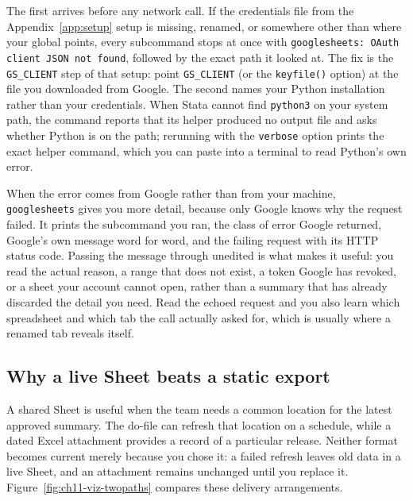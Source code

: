 \documentclass[
    a4paper,
    fontsize=10pt,
    twoside=true,
    numbers=noenddot,
]{kaobook}
\begin{document}
The first arrives before any network call. If the credentials file from the Appendix~\ref{app:setup} setup is missing, renamed, or somewhere other than where your global points, every subcommand stops at once with \texttt{googlesheets: OAuth client JSON not found}, followed by the exact path it looked at. The fix is the \texttt{GS\_CLIENT} step of that setup: point \texttt{GS\_CLIENT} (or the \texttt{keyfile()} option) at the file you downloaded from Google. The second names your Python installation rather than your credentials. When Stata cannot find \texttt{python3} on your system path, the command reports that its helper produced no output file and asks whether Python is on the path; rerunning with the \texttt{verbose} option prints the exact helper command, which you can paste into a terminal to read Python's own error.

When the error comes from Google rather than from your machine, \texttt{googlesheets} gives you more detail, because only Google knows why the request failed. It prints the subcommand you ran, the class of error Google returned, Google's own message word for word, and the failing request with its HTTP status code. Passing the message through unedited is what makes it useful: you read the actual reason, a range that does not exist, a token Google has revoked, or a sheet your account cannot open, rather than a summary that has already discarded the detail you need. Read the echoed request and you also learn which spreadsheet and which tab the call actually asked for, which is usually where a renamed tab reveals itself.

\subsection{Why a live Sheet beats a static export}
A shared Sheet is useful when the team needs a common location for the latest approved summary. The do-file can refresh that location on a schedule, while a dated Excel attachment provides a record of a particular release. Neither format becomes current merely because you chose it: a failed refresh leaves old data in a live Sheet, and an attachment remains unchanged until you replace it. Figure~\ref{fig:ch11-viz-twopaths} compares these delivery arrangements.
\end{document}
